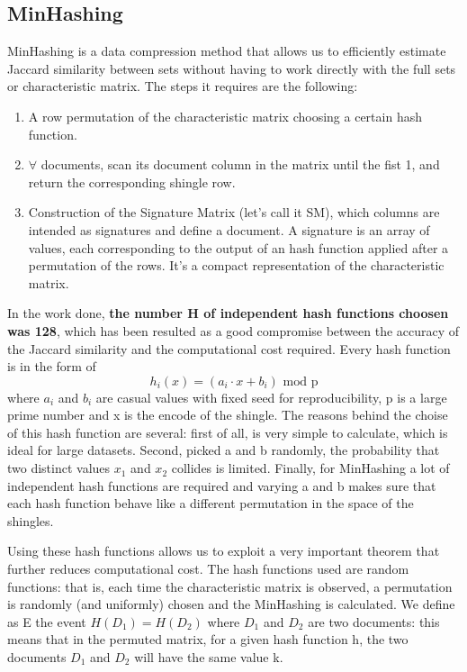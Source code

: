 \documentclass[12pt, a4paper[]{article}
\begin{document}
\subsection{MinHashing}
MinHashing is a data compression method that allows us to efficiently estimate Jaccard similarity between sets without having to work directly with the full sets or characteristic matrix. The steps it requires are the following: 
\begin{enumerate}
    \item A row permutation of the characteristic matrix choosing a certain hash function.
    \item $\forall$ documents, scan its document column in the matrix until the fist 1, and return the corresponding shingle row.
    \item Construction of the Signature Matrix (let's call it SM), which columns are intended as signatures and define a document. A signature is an array of values, each corresponding to the output of an hash function applied after a permutation of the rows. It's a compact representation of the characteristic matrix.
\end{enumerate}
In the work done, \textbf{the number H of independent hash functions choosen was 128}, which has been resulted as a good compromise between the accuracy of the Jaccard similarity and the computational cost required. Every hash function is in the form of
\begin{equation}
    h_i(x) = (a_i\cdot x + b_i) \text{ mod p} 
\end{equation}
where $a_i$ and $b_i$ are casual values with fixed seed for reproducibility, p is a large prime number and x is the encode of the shingle. The reasons behind the choise of this hash function are several: first of all, is very simple to calculate, which is ideal for large datasets. Second, picked a and b randomly, the probability that two distinct values $x_1$ and $x_2$ collides is limited. Finally, for MinHashing a lot of independent hash functions are required and varying a and b makes sure that each hash function behave like a different permutation in the space of the shingles. 


Using these hash functions allows us to exploit a very important theorem that further reduces computational cost. The hash functions used are random functions: that is, each time the characteristic matrix is observed, a permutation is randomly (and uniformly) chosen and the MinHashing is calculated. We define as E the event $H(D_1) = H(D_2)$ where $D_1$ and $D_2$ are two documents: this means that in the permuted matrix, for a given hash function h, the two documents $D_1$ and $D_2$ will have the same value k.
\end{document}
